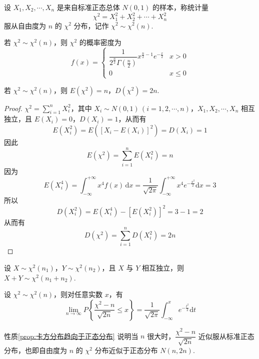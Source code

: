 \begin{definition} \label{def:卡方分布}
    设 $X_1, X_2, \cdots, X_n$ 是来自标准正态总体 $N(0,1)$ 的样本，称统计量
    $$
    \chi^2 = X_1^2 + X_2^2 + \cdots + X_n^2
    $$
    服从自由度为 $n$ 的 $\chi^2$ 分布，记作 $\chi^2 \sim \chi^2(n)$.
\end{definition}

若 $\chi^2 \sim \chi^2(n)$，则 $\chi^2$ 的概率密度为
$$
f(x) = \begin{cases}
    \dfrac{1}{2^{\frac{n}{2}} \Gamma(\frac{n}{2})} x^{\frac{n}{2} - 1} e^{-\frac{x}{2}} & x>0 \\
    0 & x \leqslant 0
\end{cases}
$$

\begin{property} \label{prop:卡方分布的数学期望和方差}
    若 $\chi^2 \sim \chi^2(n)$，则 $E(\chi^2) = n$，$D(\chi^2) = 2n$.
\end{property}

\begin{proof}
    $\chi^2 = \displaystyle\sum_{i=1}^n X_i^2$，其中 $X_i \sim N(0,1) \, (i=1,2,\cdots,n)$，$X_1, X_2, \cdots, X_n$ 相互独立，且 $E(X_i) = 0$，$D(X_i) = 1$，从而有
    $$
    E(X_i^2) = E([X_i - E(X_i)]^2) = D(X_i) = 1
    $$
    因此
    $$
    E(\chi^2) = \sum_{i=1}^n E(X_i^2) = n
    $$
    因为
    $$
    E(X_i^4) = \int_{-\infty}^{+\infty} x^4 f(x) \, \text{d}x = \dfrac{1}{\sqrt{2 \pi}} \int_{-\infty}^{+\infty} x^4 e^{-\frac{x^2}{2}} \text{d}x = 3
    $$
    所以
    $$
    D(X_i^2) = E(X_i^4) - [E(X_i^2)]^2 = 3-1 = 2
    $$
    从而有
    $$
    D(\chi^2) = \sum_{i=1}^n D(X_i^2) = 2n
    $$
\end{proof}

\begin{property}[][可加性]
    设 $X \sim \chi^2(n_1)$，$Y \sim \chi^2(n_2)$，且 $X$ 与 $Y$ 相互独立，则 $X+Y \sim \chi^2(n_1 + n_2)$.
\end{property}

\begin{property} \label{prop:卡方分布趋向于正态分布}
    设 $\chi^2 \sim \chi^2(n)$，则对任意实数 $x$，有
    $$
    \lim_{n \to \infty} P \left\{ \dfrac{\chi^2 - n}{\sqrt{2n}} \leqslant x \right\} = \dfrac{1}{\sqrt{2 \pi}} \int_{-\infty}^{x} e^{-\frac{t^2}{2}} \text{d}t
    $$
\end{property}

性质\ref*{prop:卡方分布趋向于正态分布} 说明当 $n$ 很大时，$\dfrac{\chi^2 - n}{\sqrt{2n}}$ 近似服从标准正态分布，也即自由度为 $n$ 的 $\chi^2$ 分布近似于正态分布 $N(n,2n)$.

